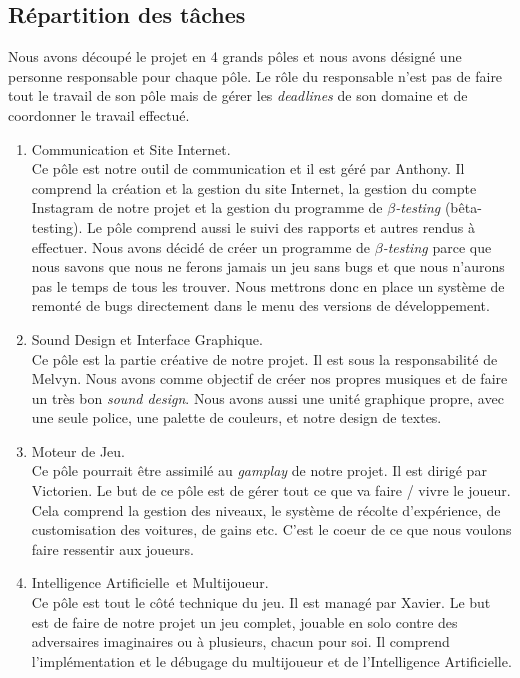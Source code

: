 \documentclass[11pt,a4paper]{article}
\newcommand{\AI}{Intelligence Artificielle}
\begin{document}
{  \subsection{Répartition des tâches} 
    Nous avons découpé le projet en 4 grands pôles et nous avons désigné une personne responsable
    pour chaque pôle. Le rôle du responsable n'est pas de faire tout le travail de son pôle mais
    de gérer les \textit{deadlines} de son domaine et de coordonner le travail effectué.
    \begin{enumerate}
      \item Communication et Site Internet.\\
        Ce pôle est notre outil de communication et il est géré par Anthony. Il comprend la création
        et la gestion du site Internet, la gestion du compte Instagram de notre projet \cite{insta} et la
        gestion du programme de \(\beta\)\textit{-testing} (bêta-testing). Le pôle comprend aussi le suivi
        des rapports et autres rendus à effectuer. Nous avons décidé de 
        créer un programme de \(\beta\)\textit{-testing} parce que nous savons que nous ne ferons
        jamais un jeu sans bugs et que nous n'aurons pas le temps de tous les trouver. Nous mettrons
        donc en place un système de remonté de bugs directement dans le menu des versions de développement.
      \item Sound Design et Interface Graphique.\\
        Ce pôle est la partie créative de notre projet. Il est sous la responsabilité de Melvyn.
        Nous avons comme objectif de créer nos propres musiques et de faire un très bon \textit{sound design}.
        Nous avons aussi une unité graphique propre, avec une seule police, une palette de couleurs, et notre
        design de textes.
      \item Moteur de Jeu.\\
        Ce pôle pourrait être assimilé au \textit{gamplay} de notre projet. Il est dirigé par Victorien.
        Le but de ce pôle est de gérer tout ce que va faire / vivre le joueur. Cela comprend la gestion des niveaux,
        le système de récolte d'expérience, de customisation des voitures, de gains etc. C'est le coeur de ce que nous voulons faire ressentir aux joueurs.
      \item \AI\, et Multijoueur.\\
        Ce pôle est tout le côté technique du jeu. Il est managé par Xavier. Le but est de faire de notre projet
        un jeu complet, jouable en solo contre des adversaires imaginaires ou à plusieurs, chacun pour soi. Il comprend l'implémentation et le débugage du multijoueur et de l'\AI.
    \end{enumerate}
  \clearpage

}
\end{document}
